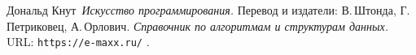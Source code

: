 \begin{thebibliography}{99}
Дональд Кнут\,
{\itshape Искусство программирования.} Перевод и издатели: В.\,Штонда, Г.\,Петриковец, А.\,Орлович.
{\itshape Справочник по алгоритмам и структурам данных.} \\URL: \texttt{https://e-maxx.ru/} .
\end{thebibliography}
\pagebreak
